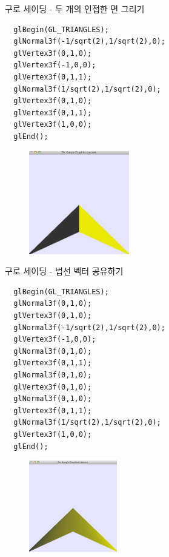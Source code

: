 \documentclass{beamer}
\begin{document}
\begin{frame}[fragile]{구로 세이딩 - 두 개의 인접한 면 그리기}

\lstset{language=C++, escapechar=^} 
\begin{lstlisting}
  glBegin(GL_TRIANGLES);
  glNormal3f(-1/sqrt(2),1/sqrt(2),0);
  glVertex3f(0,1,0);
  glVertex3f(-1,0,0);
  glVertex3f(0,1,1);
  glNormal3f(1/sqrt(2),1/sqrt(2),0);
  glVertex3f(0,1,0);
  glVertex3f(0,1,1);
  glVertex3f(1,0,0);
  glEnd();
\end{lstlisting}

\begin{figure}[h!]
  \centering
    \includegraphics[height=4.5cm]{OGL_light/twoFacesTwoNormals.png}
\end{figure}

\end{frame}

\begin{frame}[fragile]{구로 세이딩 - 법선 벡터 공유하기}

\lstset{language=C++, escapechar=^} 
\begin{lstlisting}
  glBegin(GL_TRIANGLES);
  glNormal3f(0,1,0);  
  glVertex3f(0,1,0);
  glNormal3f(-1/sqrt(2),1/sqrt(2),0);  
  glVertex3f(-1,0,0);
  glNormal3f(0,1,0);  
  glVertex3f(0,1,1);
  glNormal3f(0,1,0);  
  glVertex3f(0,1,0);
  glNormal3f(0,1,0);  
  glVertex3f(0,1,1);
  glNormal3f(1/sqrt(2),1/sqrt(2),0);  
  glVertex3f(1,0,0);
  glEnd();
\end{lstlisting}

\begin{figure}[h!]
  \centering
    \includegraphics[height=4.0cm]{OGL_light/twoFacesFourNormals.png}
\end{figure}

\end{frame}
\end{document}
